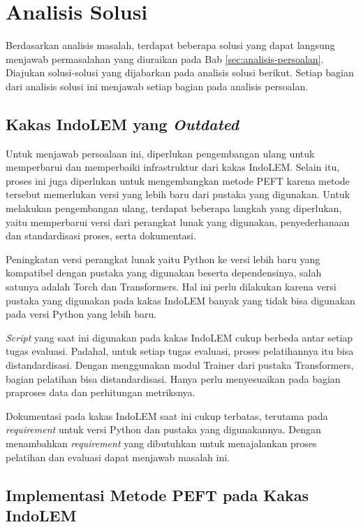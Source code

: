\section{Analisis Solusi}

Berdasarkan analisis masalah, terdapat beberapa solusi yang dapat langsung menjawab permasalahan yang diuraikan pada Bab \ref{sec:analisis-persoalan}. Diajukan solusi-solusi yang dijabarkan pada analisis solusi berikut. Setiap bagian dari analisis solusi ini  menjawab setiap bagian pada analisis persoalan.

\subsection{Kakas IndoLEM yang \textit{Outdated}}

Untuk menjawab persoalaan ini, diperlukan pengembangan ulang untuk memperbarui dan memperbaiki infrastruktur dari kakas IndoLEM. Selain itu, proses ini juga diperlukan untuk mengembangkan metode PEFT karena metode tersebut memerlukan versi yang lebih baru dari pustaka yang digunakan. Untuk melakukan pengembangan ulang, terdapat beberapa langkah yang diperlukan, yaitu memperbarui versi dari perangkat lunak yang digunakan, penyederhanaan dan standardisasi proses, serta dokumentasi.

Peningkatan versi perangkat lunak yaitu Python ke versi lebih baru yang kompatibel dengan pustaka yang  digunakan beserta dependensinya, salah satunya adalah Torch dan Transformers. Hal ini perlu dilakukan karena versi pustaka yang digunakan pada kakas IndoLEM banyak yang tidak bisa digunakan pada versi Python yang lebih baru.

\textit{Script} yang saat ini digunakan pada kakas IndoLEM cukup berbeda antar setiap tugas evaluasi. Padahal, untuk setiap tugas evaluasi, proses pelatihannya itu bisa distandardisasi. Dengan menggunakan modul Trainer dari pustaka Transformers, bagian pelatihan bisa distandardisasi. Hanya perlu menyesuaikan pada bagian praproses data dan perhitungan metriksnya.

Dokumentasi pada kakas IndoLEM saat ini cukup terbatas, terutama pada \textit{requirement} untuk versi Python dan pustaka yang digunakannya. Dengan menambahkan \textit{requirement} yang dibutuhkan untuk menajalankan proses pelatihan dan evaluasi dapat menjawab masalah ini.

\subsection{Implementasi Metode PEFT pada Kakas IndoLEM}

